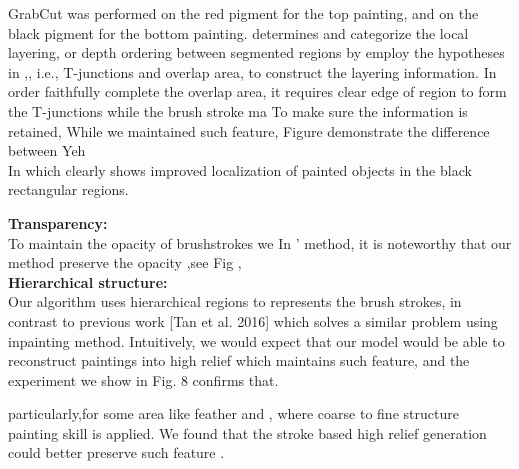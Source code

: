 GrabCut was performed on the red pigment for the top painting, and on the black pigment for the bottom painting.  
\cite{yeh2017interactive} determines and categorize the local layering, or depth ordering between segmented regions by employ the hypotheses in \cite{yeh20152},\cite{liu2013stereoscopizing}, i.e., T-junctions and overlap area, to construct the layering information. In order faithfully complete the overlap area, it requires clear edge of region to form the T-junctions while the brush stroke ma
To make sure the information is retained,   While we maintained such feature,  Figure demonstrate the difference between Yeh  \\
In  which clearly shows improved localization of  painted objects in the black rectangular regions.

\textbf{Transparency: }\\
To maintain the opacity of brushstrokes we 
In \cite{yeh2017interactive}' method, it is noteworthy that our method preserve the opacity ,see Fig , \\ 


\textbf{Hierarchical structure: }\\
Our algorithm uses hierarchical regions to represents the brush strokes, in contrast to previous work [Tan et al. 2016] which solves a similar problem using inpainting method. Intuitively, we would expect that our model would be able to reconstruct paintings into high relief which maintains such feature, and the experiment we show in Fig. 8 confirms that. 

particularly,for some area like feather and , where coarse to fine structure painting skill is applied. We found that the stroke based high relief generation could better preserve such feature . 

 


